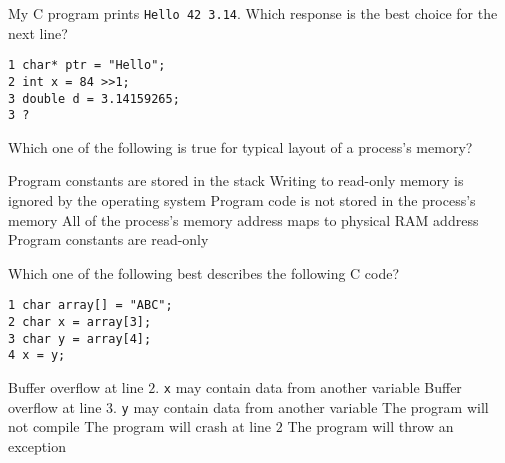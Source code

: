 \variant
My C program prints {\tt Hello 42 3.14}. Which response is the best choice for the next line?
\begin{verbatim}
1 char* ptr = "Hello";
2 int x = 84 >>1;
3 double d = 3.14159265;
3 ?
\end{verbatim}
\begin{answers}
\end{answers}
\begin{solution}
\end{solution}


\variant
Which one of the following is true for typical layout of a process's memory?
\begin{answers}
 
\answer Program constants are stored in the stack
\answer Writing to read-only memory is ignored by the operating system
\answer Program code is not stored in the process's memory
\answer All of the process's memory address maps to physical RAM address
\correctanswer Program constants are read-only

\end{answers}
\begin{solution}
\end{solution}


\variant
Which one of the following best describes the following C code?
\begin{verbatim}
1 char array[] = "ABC";
2 char x = array[3];
3 char y = array[4];
4 x = y;
\end{verbatim}
\begin{answers}
\answer Buffer overflow at line $2$. {\tt x} may contain data from another variable
\correctanswer Buffer overflow at line $3$. {\tt y} may contain data from another variable 
\answer The program will not compile
\answer The program will crash at line $2$ 
\answer The program will throw an exception
\end{answers}
\begin{solution}
\end{solution}

